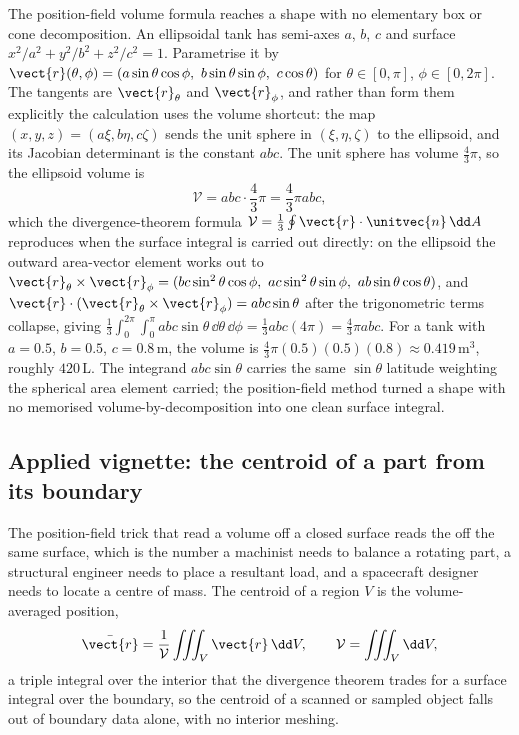 \begin{example}
The position-field volume formula reaches a shape with no elementary
box or cone decomposition. An ellipsoidal tank has semi-axes $a$, $b$,
$c$ and surface $x^{2}/a^{2} + y^{2}/b^{2} + z^{2}/c^{2} = 1$.
Parametrise it by $\vect{r}(\theta, \phi) = (a\sin\theta\cos\phi,\
b\sin\theta\sin\phi,\ c\cos\theta)$ for $\theta \in [0, \pi]$, $\phi
\in [0, 2\pi]$. The tangents are $\vect{r}_{\theta}$ and
$\vect{r}_{\phi}$, and rather than form them explicitly the calculation
uses the volume shortcut: the map $(x, y, z) = (a\xi, b\eta, c\zeta)$
sends the unit sphere in $(\xi, \eta, \zeta)$ to the ellipsoid, and its
Jacobian determinant is the constant $abc$. The unit sphere has volume
$\tfrac{4}{3}\pi$, so the ellipsoid volume is
\[
\mathcal{V} = abc\cdot\frac{4}{3}\pi = \frac{4}{3}\pi abc,
\]
which the divergence-theorem formula $\mathcal{V} = \tfrac{1}{3}\oint
\vect{r}\cdot\unitvec{n}\,\dd A$ reproduces when the surface integral
is carried out directly: on the ellipsoid the outward area-vector
element works out to $\vect{r}_{\theta}\times\vect{r}_{\phi} =
(bc\sin^{2}\theta\cos\phi,\ ac\sin^{2}\theta\sin\phi,\ ab\sin\theta
\cos\theta)$, and $\vect{r}\cdot(\vect{r}_{\theta}\times
\vect{r}_{\phi}) = abc\sin\theta$ after the trigonometric terms
collapse, giving $\tfrac{1}{3}\int_{0}^{2\pi}\int_{0}^{\pi}abc
\sin\theta\,\dd\theta\,\dd\phi = \tfrac{1}{3}abc(4\pi) = \tfrac{4}{3}
\pi abc$. For a tank with $a = 0.5$, $b = 0.5$, $c = 0.8\,\si{\meter}$,
the volume is $\tfrac{4}{3}\pi(0.5)(0.5)(0.8) \approx 0.419\,\si{\meter
\cubed}$, roughly $420\,\si{\liter}$. The integrand $abc\sin\theta$
carries the same $\sin\theta$ latitude weighting the spherical area
element carried; the position-field method turned a shape with no
memorised volume-by-decomposition into one clean surface integral.
\end{example}

\subsection{Applied vignette: the centroid of a part from its boundary}
\pathtag{standard}

The position-field trick that read a volume off a closed surface reads
the \engterm{centroid} off the same surface, which is the number a
machinist needs to balance a rotating part, a structural engineer needs
to place a resultant load, and a spacecraft designer needs to locate a
centre of mass. The centroid of a region $V$ is the volume-averaged
position,
\[
\bar{\vect{r}} = \frac{1}{\mathcal{V}}\iiint_{V}\vect{r}\,\dd V,
\qquad \mathcal{V} = \iiint_{V}\dd V,
\]
a triple integral over the interior that the divergence theorem trades
for a surface integral over the boundary, so the centroid of a scanned
or sampled object falls out of boundary data alone, with no interior
meshing.

